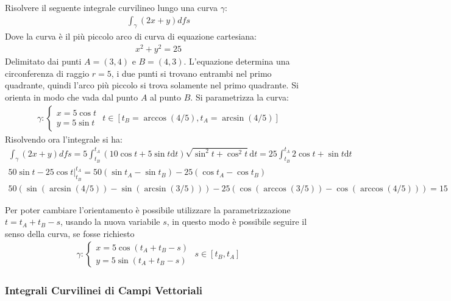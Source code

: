 \documentclass{article}
\newcommand{\df}{\mathrm{d}}
\numberwithin{equation}{subsection}
\begin{document}
Risolvere il seguente integrale curvilineo lungo una curva $\gamma$:
\begin{gather*}
    \int_\gamma(2x+y)df s
\end{gather*}
Dove la curva è il più piccolo arco di curva di equazione cartesiana:
\begin{gather*}
    x^2+y^2=25
\end{gather*}
Delimitato dai punti $A=(3,4)$ e $B=(4,3)$. L'equazione determina una circonferenza di raggio $r=5$, i due punti si trovano entrambi nel primo quadrante, quindi l'arco più piccolo si trova solamente nel primo quadrante. 
Si orienta in modo che vada dal punto $A$ al punto $B$. Si parametrizza la curva:
\begin{gather*}
    \gamma:\begin{cases}
        x=5\cos t\\y=5\sin t
    \end{cases}\,\,t\in[t_B=\arccos(4/5),t_A=\arcsin(4/5)]
\end{gather*}
Risolvendo ora l'integrale si ha:
\begin{gather*}
    \int_\gamma(2x+y)df s=5\int_{t_B}^{t_A}(10\cos t+5\sin t\df t)\sqrt{\sin^2t+\cos^2t}\df t=25\int_{t_B}^{t_A}2\cos t+\sin t\df t\\
    50\sin t-25\cos t\bigg|_{t_B}^{t_A}=50(\sin t_A-\sin t_B)-25(\cos t_A-\cos t_B)\\
    50(\sin(\arcsin(4/5))-\sin(\arcsin(3/5)))-25(\cos(\arccos(3/5))-\cos(\arccos(4/5)))=15
\end{gather*}

Per poter cambiare l'orientamento è possibile utilizzare la parametrizzazione $t=t_A+t_B-s$, usando la nuova variabile $s$, in questo modo è possibile seguire il senso della curva, se fosse richiesto
\begin{gather*}
    \gamma:\begin{cases}
        x=5\cos(t_A+t_B-s)\\y=5\sin(t_A+t_B-s)
    \end{cases}\,\, s\in[t_B,t_A]
\end{gather*}

\subsubsection{Integrali Curvilinei di Campi Vettoriali}
\end{document}
